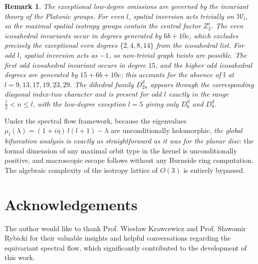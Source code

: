 \documentclass[twoside,11pt]{article}
\newtheorem{remark}[theorem]{Remark}
\begin{document}
\begin{remark}
The exceptional low-degree omissions are governed by the invariant theory of the Platonic groups. For even $l$, spatial inversion acts trivially on $\mathcal W_l$, so the maximal spatial isotropy groups contain the central factor $Z_2^c$. The even icosahedral invariants occur in degrees generated by
$6b+10c$, which excludes precisely the exceptional even degrees $\{2,4,8,14\}$ from the icosahedral list. For odd $l$, spatial inversion acts as $-1$, so non-trivial graph twists are possible. The first odd
icosahedral invariant occurs in degree $15$, and the higher odd icosahedral degrees are generated by $15+6b+10c$; this accounts for the absence of $\mathbb I$ at $l=9,13,17,19,23,29$. The dihedral family $D_{2n}^d$ appears
through the corresponding diagonal index-two character and is present for odd
$l$ exactly in the range $\frac l2<n\leq l$, with the low-degree exception $l=5$ giving only $D_6^d$ and $D_8^d$.
\end{remark}
Under the spectral flow framework, because the eigenvalues $\mu_l(\lambda) = (1+i\eta)\,l(l+1) - \lambda$ are unconditionally holomorphic, 
\emph{the global bifurcation analysis is exactly as straightforward as it was for the planar disc}: the formal dimension of any maximal orbit type in the kernel is unconditionally positive, and macroscopic escape follows without any Burnside ring computation. The algebraic complexity of the 
isotropy lattice of $O(3)$ is entirely bypassed.

\section*{Acknowledgements}
The author would like to thank Prof. Wiesław Krawcewicz and Prof. Sławomir Rybicki for their valuable insights and helpful conversations regarding the equivariant spectral flow, which significantly contributed to the development of this work.
\newpage
\appendix
\end{document}
